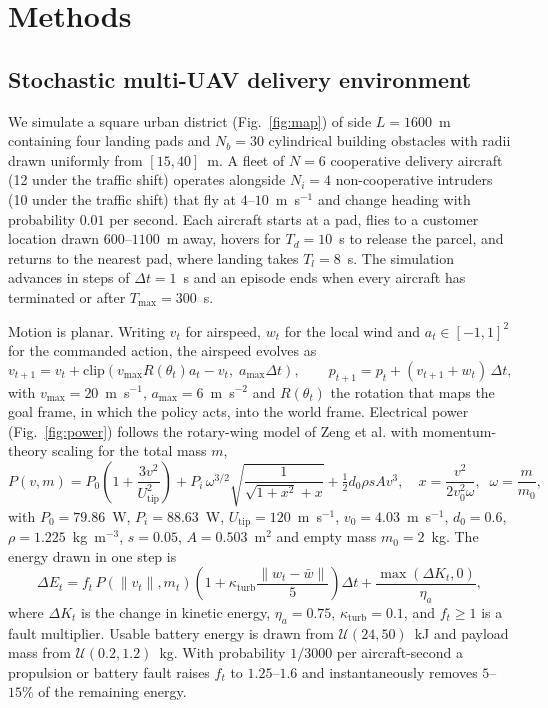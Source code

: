 \section*{Methods}

\subsection*{Stochastic multi-UAV delivery environment}

We simulate a square urban district (Fig.~\ref{fig:map}) of side $L=1600$~m containing four landing pads and $N_b=30$ cylindrical building obstacles with radii drawn uniformly from $[15,40]$~m. A fleet of $N=6$ cooperative delivery aircraft (12 under the traffic shift) operates alongside $N_i=4$ non-cooperative intruders (10 under the traffic shift) that fly at $4$--$10$~m~s$^{-1}$ and change heading with probability $0.01$ per second. Each aircraft starts at a pad, flies to a customer location drawn $600$--$1100$~m away, hovers for $T_d=10$~s to release the parcel, and returns to the nearest pad, where landing takes $T_l=8$~s. The simulation advances in steps of $\Delta t=1$~s and an episode ends when every aircraft has terminated or after $T_{\max}=300$~s.

Motion is planar. Writing $v_t$ for airspeed, $w_t$ for the local wind and $a_t\in[-1,1]^2$ for the commanded action, the airspeed evolves as
\begin{equation}
v_{t+1} = v_t + \mathrm{clip}\!\left(v_{\max} R(\theta_t) a_t - v_t,\; a_{\max}\Delta t\right), \qquad p_{t+1} = p_t + (v_{t+1} + w_t)\,\Delta t ,
\end{equation}
with $v_{\max}=20$~m~s$^{-1}$, $a_{\max}=6$~m~s$^{-2}$ and $R(\theta_t)$ the rotation that maps the goal frame, in which the policy acts, into the world frame. Electrical power (Fig.~\ref{fig:power}) follows the rotary-wing model of Zeng et al.\cite{zeng2019energy} with momentum-theory scaling for the total mass $m$,
\begin{equation}
P(v,m) = P_0\!\left(1+\frac{3v^2}{U_{\mathrm{tip}}^2}\right) + P_{i}\,\omega^{3/2}\sqrt{\frac{1}{\sqrt{1+x^2}+x}} + \tfrac{1}{2} d_0 \rho s A v^3, \quad x=\frac{v^2}{2 v_0^2 \omega},\;\; \omega=\frac{m}{m_0},
\label{eq:power}
\end{equation}
with $P_0=79.86$~W, $P_i=88.63$~W, $U_{\mathrm{tip}}=120$~m~s$^{-1}$, $v_0=4.03$~m~s$^{-1}$, $d_0=0.6$, $\rho=1.225$~kg~m$^{-3}$, $s=0.05$, $A=0.503$~m$^2$ and empty mass $m_0=2$~kg. The energy drawn in one step is
\begin{equation}
\Delta E_t = f_t\,P(\lVert v_t\rVert, m_t)\left(1+\kappa_{\mathrm{turb}}\frac{\lVert w_t-\bar w\rVert}{5}\right)\Delta t + \frac{\max(\Delta K_t,0)}{\eta_a},
\end{equation}
where $\Delta K_t$ is the change in kinetic energy, $\eta_a=0.75$, $\kappa_{\mathrm{turb}}=0.1$, and $f_t\ge 1$ is a fault multiplier. Usable battery energy is drawn from $\mathcal{U}(24,50)$~kJ and payload mass from $\mathcal{U}(0.2,1.2)$~kg. With probability $1/3000$ per aircraft-second a propulsion or battery fault raises $f_t$ to $1.25$--$1.6$ and instantaneously removes $5$--$15\%$ of the remaining energy.

